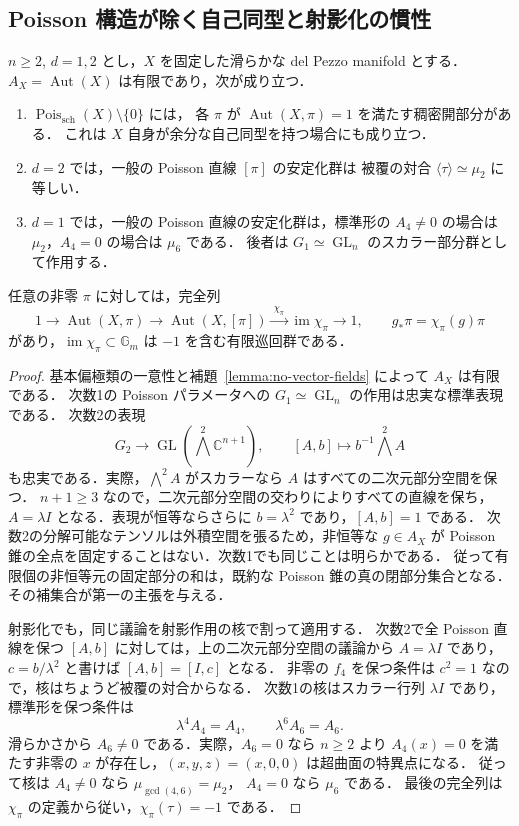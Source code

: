 \subsection{Poisson 構造が除く自己同型と射影化の慣性}

\begin{proposition}
\label{prop:generic-poisson-stabilizer}
$n\geq2$, $d=1,2$ とし，$X$ を固定した滑らかな del Pezzo manifold とする．
$A_X=\operatorname{Aut}(X)$ は有限であり，次が成り立つ．
\begin{enumerate}
\item $\operatorname{Pois}_{\mathrm{sch}}(X)\setminus\{0\}$ には，
各 $\pi$ が $\operatorname{Aut}(X,\pi)=1$ を満たす稠密開部分がある．
これは $X$ 自身が余分な自己同型を持つ場合にも成り立つ．
\item $d=2$ では，一般の Poisson 直線 $[\pi]$ の安定化群は
被覆の対合 $\langle\tau\rangle\simeq\mu_2$ に等しい．
\item $d=1$ では，一般の Poisson 直線の安定化群は，標準形の
$A_4\ne0$ の場合は $\mu_2$，$A_4=0$ の場合は $\mu_6$ である．
後者は $G_1\simeq\operatorname{GL}_n$ のスカラー部分群として作用する．
\end{enumerate}
任意の非零 $\pi$ に対しては，完全列
\[
 1\longrightarrow\operatorname{Aut}(X,\pi)
 \longrightarrow\operatorname{Aut}(X,[\pi])
 \xrightarrow{\ \chi_\pi\ }\operatorname{im}\chi_\pi
 \longrightarrow1,
 \qquad g_*\pi=\chi_\pi(g)\pi
\]
があり，$\operatorname{im}\chi_\pi\subset\mathbb G_m$ は $-1$ を含む有限巡回群である．
\end{proposition}
\begin{proof}
基本偏極類の一意性と補題~\ref{lemma:no-vector-fields} によって $A_X$ は有限である．
次数1の Poisson パラメータへの $G_1\simeq\operatorname{GL}_n$ の作用は忠実な標準表現である．
次数2の表現
\[
 G_2\longrightarrow\operatorname{GL}(\bigwedge^2\mathbb C^{n+1}),
 \qquad[A,b]\longmapsto b^{-1}\bigwedge^2A
\]
も忠実である．実際，$\bigwedge^2A$ がスカラーなら $A$ はすべての二次元部分空間を保つ．
$n+1\geq3$ なので，二次元部分空間の交わりによりすべての直線を保ち，
$A=\lambda I$ となる．表現が恒等ならさらに $b=\lambda^2$ であり，$[A,b]=1$ である．
次数2の分解可能なテンソルは外積空間を張るため，非恒等な $g\in A_X$ が
Poisson 錐の全点を固定することはない．次数1でも同じことは明らかである．
従って有限個の非恒等元の固定部分の和は，既約な Poisson 錐の真の閉部分集合となる．
その補集合が第一の主張を与える．

射影化でも，同じ議論を射影作用の核で割って適用する．
次数2で全 Poisson 直線を保つ $[A,b]$ に対しては，上の二次元部分空間の議論から
$A=\lambda I$ であり，$c=b/\lambda^2$ と書けば $[A,b]=[I,c]$ となる．
非零の $f_4$ を保つ条件は $c^2=1$ なので，核はちょうど被覆の対合からなる．
次数1の核はスカラー行列 $\lambda I$ であり，標準形を保つ条件は
\[
 \lambda^4A_4=A_4,\qquad\lambda^6A_6=A_6.
\]
滑らかさから $A_6\ne0$ である．実際，$A_6=0$ なら $n\geq2$ より
$A_4(x)=0$ を満たす非零の $x$ が存在し，$(x,y,z)=(x,0,0)$ は超曲面の特異点になる．
従って核は $A_4\ne0$ なら $\mu_{\gcd(4,6)}=\mu_2$，
$A_4=0$ なら $\mu_6$ である．
最後の完全列は $\chi_\pi$ の定義から従い，$\chi_\pi(\tau)=-1$ である．
\end{proof}

